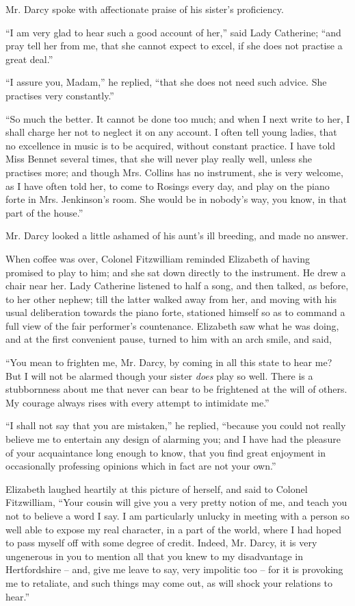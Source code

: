 Mr. Darcy spoke with affectionate praise of his sister’s
proficiency.

“I am very glad to hear such a good account of her,”
said Lady Catherine; “and pray tell her from me, that
she cannot expect to excel, if she does not practise a great
deal.”

“I assure you, Madam,” he replied, “that she does
not need such advice. She practises very constantly.”

“So much the better. It cannot be done too much;
and when I next write to her, I shall charge her not to
neglect it on any account. I often tell young ladies,
that no excellence in music is to be acquired, without
constant practice. I have told Miss Bennet several times,
that she will never play really well, unless she practises
more; and though Mrs. Collins has no instrument, she
is very welcome, as I have often told her, to come to
Rosings every day, and play on the piano forte in Mrs.
Jenkinson’s room. She would be in nobody’s way, you
know, in that part of the house.”

Mr. Darcy looked a little ashamed of his aunt’s ill
breeding, and made no answer.

When coffee was over, Colonel Fitzwilliam reminded
Elizabeth of having promised to play to him; and she
sat down directly to the instrument. He drew a chair
near her. Lady Catherine listened to half a song, and
then talked, as before, to her other nephew; till the
latter walked away from her, and moving with his usual
deliberation towards the piano forte, stationed himself so
as to command a full view of the fair performer’s countenance.
Elizabeth saw what he was doing, and at the
first convenient pause, turned to him with an arch smile,
and said,

“You mean to frighten me, Mr. Darcy, by coming in
all this state to hear me? But I will not be alarmed
though your sister \textit{does} play so well. There is a stubbornness
about me that never can bear to be frightened at
the will of others. My courage always rises with every
attempt to intimidate me.”

“I shall not say that you are mistaken,” he replied,
“because you could not really believe me to entertain
any design of alarming you; and I have had the pleasure
of your acquaintance long enough to know, that you find
great enjoyment in occasionally professing opinions which
in fact are not your own.”

Elizabeth laughed heartily at this picture of herself,
and said to Colonel Fitzwilliam, “Your cousin will give
you a very pretty notion of me, and teach you not to
believe a word I say. I am particularly unlucky in meeting
with a person so well able to expose my real character,
in a part of the world, where I had hoped to pass myself
off with some degree of credit. Indeed, Mr. Darcy, it is
very ungenerous in you to mention all that you knew to
my disadvantage in Hertfordshire -- and, give me leave
to say, very impolitic too -- for it is provoking me to
retaliate, and such things may come out, as will shock
your relations to hear.”

